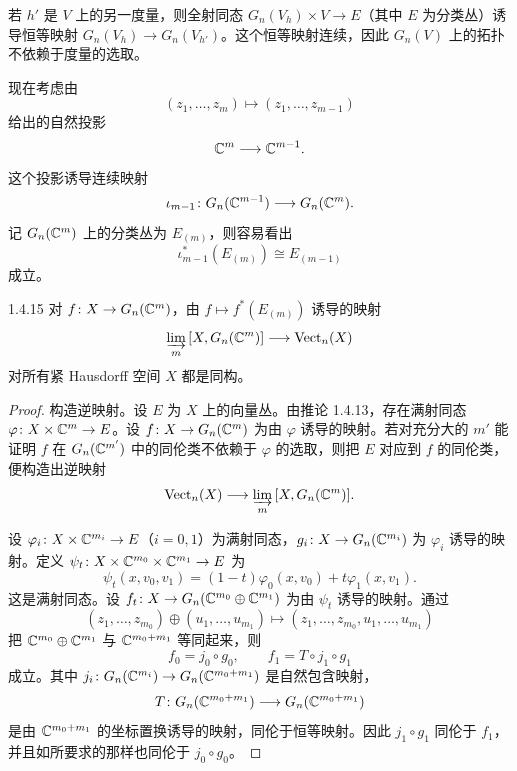 若 $h'$ 是 $V$ 上的另一度量，则全射同态 $G_n(V_h)\times V\to E$（其中 $E$ 为分类丛）诱导恒等映射 $G_n(V_h)\to G_n(V_{h'})$。这个恒等映射连续，因此 $G_n(V)$ 上的拓扑不依赖于度量的选取。

现在考虑由
\[
(z_1,\dots,z_m)\longmapsto(z_1,\dots,z_{m-1})
\]
给出的自然投影
\[
\mathbb{C}^m\longrightarrow\mathbb{C}^{m-1}.
\]
这个投影诱导连续映射
\[
\iota_{m-1}\colon G_n(\mathbb{C}^{m-1})\longrightarrow G_n(\mathbb{C}^m).
\]
记 $G_n(\mathbb{C}^m)$ 上的分类丛为 $E_{(m)}$，则容易看出
\[
\iota_{m-1}^{*}(E_{(m)})\cong E_{(m-1)}
\]
成立。

\begin{theorem*}{1.4.15}
  对 $f\colon X\to G_n(\mathbb{C}^m)$，由 $f\mapsto f^{*}(E_{(m)})$ 诱导的映射
  \[
  \varinjlim_{m}\,[X,G_n(\mathbb{C}^m)]\longrightarrow\operatorname{Vect}_n(X)
  \]
  对所有紧 Hausdorff 空间 $X$ 都是同构。
\end{theorem*}

\begin{proof}
  构造逆映射。设 $E$ 为 $X$ 上的向量丛。由推论 1.4.13，存在满射同态 $\varphi\colon X\times\mathbb{C}^m\to E$。设 $f\colon X\to G_n(\mathbb{C}^m)$ 为由 $\varphi$ 诱导的映射。若对充分大的 $m'$ 能证明 $f$ 在 $G_n(\mathbb{C}^{m'})$ 中的同伦类不依赖于 $\varphi$ 的选取，则把 $E$ 对应到 $f$ 的同伦类，便构造出逆映射
  \[
  \operatorname{Vect}_n(X)\longrightarrow\varinjlim_{m}\,[X,G_n(\mathbb{C}^m)].
  \]

  设 $\varphi_i\colon X\times\mathbb{C}^{m_i}\to E$（$i=0,1$）为满射同态，$g_i\colon X\to G_n(\mathbb{C}^{m_i})$ 为 $\varphi_i$ 诱导的映射。定义 $\psi_t\colon X\times\mathbb{C}^{m_0}\times\mathbb{C}^{m_1}\to E$ 为
  \[
  \psi_t(x,v_0,v_1)=(1-t)\varphi_0(x,v_0)+t\varphi_1(x,v_1).
  \]
  这是满射同态。设 $f_t\colon X\to G_n(\mathbb{C}^{m_0}\oplus\mathbb{C}^{m_1})$ 为由 $\psi_t$ 诱导的映射。通过
  \[
  (z_1,\dots,z_{m_0})\oplus(u_1,\dots,u_{m_1})\longmapsto(z_1,\dots,z_{m_0},u_1,\dots,u_{m_1})
  \]
  把 $\mathbb{C}^{m_0}\oplus\mathbb{C}^{m_1}$ 与 $\mathbb{C}^{m_0+m_1}$ 等同起来，则
  \[
  f_0=j_0\circ g_0,\qquad f_1=T\circ j_1\circ g_1
  \]
  成立。其中 $j_i\colon G_n(\mathbb{C}^{m_i})\to G_n(\mathbb{C}^{m_0+m_1})$ 是自然包含映射，
  \[
  T\colon G_n(\mathbb{C}^{m_0+m_1})\longrightarrow G_n(\mathbb{C}^{m_0+m_1})
  \]
  是由 $\mathbb{C}^{m_0+m_1}$ 的坐标置换诱导的映射，同伦于恒等映射。因此 $j_1\circ g_1$ 同伦于 $f_1$，并且如所要求的那样也同伦于 $j_0\circ g_0$。
\end{proof}

